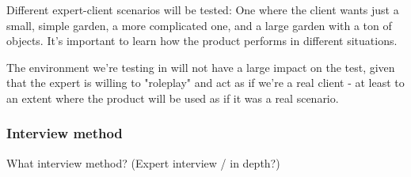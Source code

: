 Different expert-client scenarios will be tested: One where the client wants just a small, simple garden, a more complicated one, and a large garden with a ton of objects. It's important to learn how the product performs in different situations. 

The environment we're testing in will not have a large impact on the test, given that the expert is willing to "roleplay" and act as if we're a real client - at least to an extent where the product will be used as if it was a real scenario. 


\subsubsection{Interview method}
What interview method? (Expert interview / in depth?)

